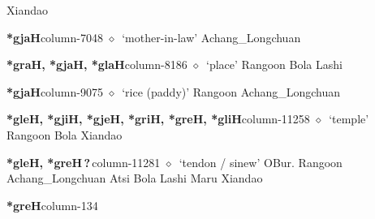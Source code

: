 \hspace{1ex}
         Xiandao 
  \item {\footnotesize \textbf{*gjaH}}{\tiny column-7048}
         $\diamond$~`mother-in-law'
         Achang\_Longchuan 
  \item {\footnotesize \textbf{*graH, *gjaH, *glaH}}{\tiny column-8186}
         $\diamond$~`place'
         Rangoon 
\hspace{1ex}
         Bola 
\hspace{1ex}
         Lashi 
  \item {\footnotesize \textbf{*gjaH}}{\tiny column-9075}
         $\diamond$~`rice (paddy)'
         Rangoon 
\hspace{1ex}
         Achang\_Longchuan 
  \item {\footnotesize \textbf{*gleH, *gjiH, *gjeH, *griH, *greH, *gliH}}{\tiny column-11258}
         $\diamond$~`temple'
         Rangoon 
\hspace{1ex}
         Bola 
\hspace{1ex}
         Xiandao 
  \item {\footnotesize \textbf{*gleH, *greH\,?\,}}{\tiny column-11281}
         $\diamond$~`tendon / sinew'
         OBur. 
\hspace{1ex}
         Rangoon 
\hspace{1ex}
         Achang\_Longchuan 
\hspace{1ex}
         Atsi 
\hspace{1ex}
         Bola 
\hspace{1ex}
         Lashi 
\hspace{1ex}
         Maru 
\hspace{1ex}
         Xiandao 
  \item {\footnotesize \textbf{*greH}}{\tiny column-134}
